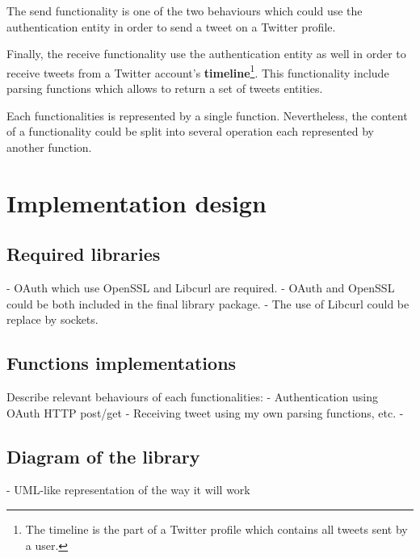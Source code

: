 The send functionality is one of the two behaviours which could use the authentication entity in order to send a tweet on a Twitter profile.

Finally, the receive functionality use the authentication entity as well in order to receive tweets from a Twitter account's \textbf{timeline}\footnote{The timeline is the part of a Twitter profile which contains all tweets sent by a user.}. This functionality include parsing functions which allows to return a set of tweets entities. 

Each functionalities is represented by a single function. Nevertheless, the content of a functionality could be split into several operation each represented by another function.



\section{Implementation design}

\subsection{Required libraries}

- OAuth which use OpenSSL and Libcurl are required.
- OAuth and OpenSSL could be both included in the final library package.
- The use of Libcurl could be replace by sockets.


\subsection{Functions implementations}

Describe relevant behaviours of each functionalities:
- Authentication using OAuth HTTP post/get
- Receiving tweet using my own parsing functions, etc.
- 


\subsection{Diagram of the library}

- UML-like representation of the way it will work



\clearpage